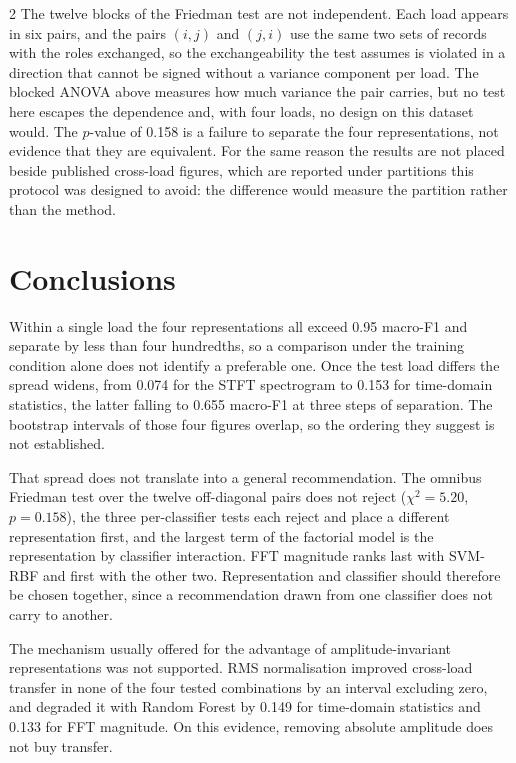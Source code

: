 \documentclass[12pt,twoside,titlepage]{ingenius}
\begin{document}
\begin{multicols}{2}
The twelve blocks of the Friedman test are not independent. Each load appears in
six pairs, and the pairs $(i,j)$ and $(j,i)$ use the same two sets of records
with the roles exchanged, so the exchangeability the test assumes is violated in
a direction that cannot be signed without a variance component per load. The
blocked ANOVA above measures how much variance the pair carries, but no test
here escapes the dependence and, with four loads, no design on this dataset
would. The $p$-value of 0.158 is a failure to separate the four representations,
not evidence that they are equivalent. For the same reason the results are not
placed beside published cross-load figures, which are reported under partitions
this protocol was designed to avoid: the difference would measure the partition
rather than the method.

\section{Conclusions}

Within a single load the four representations all exceed 0.95 macro-F1 and
separate by less than four hundredths, so a comparison under the training
condition alone does not identify a preferable one. Once the test load differs
the spread widens, from 0.074 for the STFT spectrogram to 0.153 for time-domain
statistics, the latter falling to 0.655 macro-F1 at three steps of separation.
The bootstrap intervals of those four figures overlap, so the ordering they
suggest is not established.

That spread does not translate into a general recommendation. The omnibus
Friedman test over the twelve off-diagonal pairs does not reject
($\chi^2 = 5.20$, $p = 0.158$), the three per-classifier tests each reject and
place a different representation first, and the largest term of the factorial
model is the representation by classifier interaction. FFT magnitude ranks last
with SVM-RBF and first with the other two. Representation and classifier should
therefore be chosen together, since a recommendation drawn from one classifier
does not carry to another.

The mechanism usually offered for the advantage of amplitude-invariant
representations was not supported. RMS normalisation improved cross-load
transfer in none of the four tested combinations by an interval excluding zero,
and degraded it with Random Forest by 0.149 for time-domain statistics and 0.133
for FFT magnitude. On this evidence, removing absolute amplitude does not buy
transfer.


\end{multicols}
\end{document}
